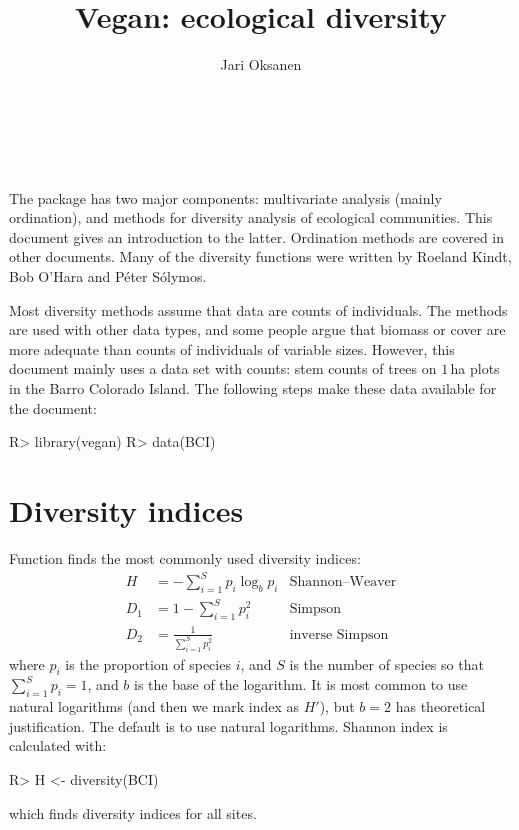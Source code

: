 \documentclass[article,nojss]{jss}
\title{Vegan: ecological diversity} \author{Jari Oksanen}
\begin{document}


\tableofcontents

\section*{~}

The  package has two major components:
multivariate analysis (mainly ordination), and methods for diversity
analysis of ecological communities.  This document gives an
introduction to the latter.  Ordination methods are covered in other
documents.  Many of the diversity functions were written by Roeland
Kindt, Bob O'Hara and P{\'e}ter S{\'o}lymos.

Most diversity methods assume that data are counts of individuals.
The methods are used with other data types, and some people argue that
biomass or cover are more adequate than counts of individuals of
variable sizes.  However, this document mainly uses a data set with
counts: stem counts of trees on $1$\,ha plots in the Barro Colorado
Island.  The following steps make these data available for the
document:
\begin{Schunk}
\begin{Sinput}
R> library(vegan)
R> data(BCI)
\end{Sinput}
\end{Schunk}

\section{Diversity indices}

Function  finds the most commonly used diversity
indices:
\begin{align}
H &= - \sum_{i=1}^S p_i \log_b  p_i & \text{Shannon--Weaver}\\
D_1 &= 1 - \sum_{i=1}^S p_i^2  &\text{Simpson}\\
D_2 &= \frac{1}{\sum_{i=1}^S p_i^2}  &\text{inverse Simpson}
\end{align}
where $p_i$ is the proportion of species $i$, and $S$ is the number of
species so that $\sum_{i=1}^S p_i = 1$, and $b$ is the base of the
logarithm.  It is most common to use natural logarithms (and then we
mark index as $H'$), but $b=2$ has
theoretical justification. The default is to use natural logarithms.
Shannon index is calculated with:
\begin{Schunk}
\begin{Sinput}
R> H <- diversity(BCI)
\end{Sinput}
\end{Schunk}
which finds diversity indices for all sites.
\end{document}
